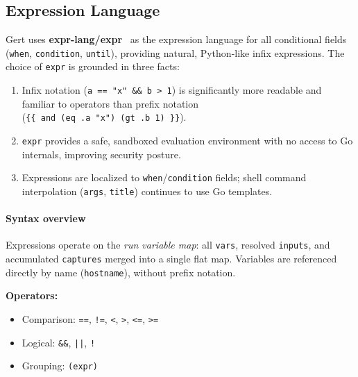 \subsection{Expression Language}
\label{subsec:expressions}

Gert uses \textbf{expr-lang/expr}~\cite{expr-lang-docs} as the expression language for all
conditional fields (\texttt{when}, \texttt{condition}, \texttt{until}), providing
natural, Python-like infix expressions.  The choice of \texttt{expr} is grounded in three facts:
\begin{enumerate}
  \item Infix notation (\texttt{a == "x" \&\& b > 1}) is significantly more
        readable and familiar to operators than prefix notation (\texttt{\{\{\ and\ (eq\ .a\ "x")\ (gt\ .b\ 1)\ \}\}}).
  \item \texttt{expr} provides a safe, sandboxed evaluation environment with no
        access to Go internals, improving security posture.
  \item Expressions are localized to
        \texttt{when}/\texttt{condition} fields; shell command interpolation
        (\texttt{args}, \texttt{title}) continues to use Go templates.
\end{enumerate}

\paragraph{Syntax overview}

Expressions operate on the \emph{run variable map}: all \texttt{vars}, resolved
\texttt{inputs}, and accumulated \texttt{captures} merged into a single flat
map.  Variables are referenced directly by name (\texttt{hostname}), without
prefix notation.

\textbf{Operators:}
\begin{itemize}
  \item Comparison: \texttt{==}, \texttt{!=}, \texttt{<}, \texttt{>}, \texttt{<=}, \texttt{>=}
  \item Logical: \texttt{\&\&}, \texttt{||}, \texttt{!}
  \item Grouping: \texttt{(expr)}
\end{itemize}

